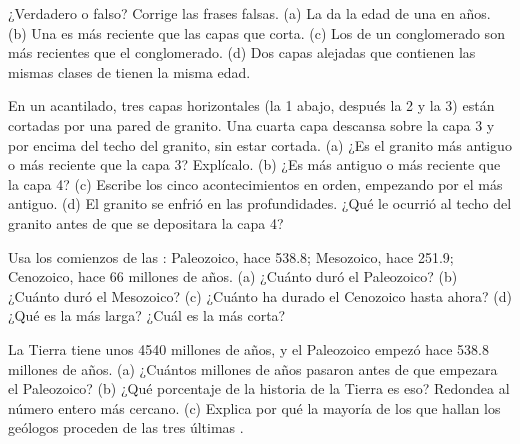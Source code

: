 \begin{exercise}[$\star$]\label{exo:g7:geological-time:4}
¿Verdadero o falso? Corrige las frases falsas. (a) La  da
la edad de una  en años. (b) Una  es más reciente que las capas
que corta. (c) Los  de un conglomerado son más recientes que el
conglomerado. (d) Dos capas alejadas que contienen las mismas clases de
 tienen la misma edad.
\end{exercise}

\begin{exercise}[$\star\star$]\label{exo:g7:geological-time:5}
En un acantilado, tres capas horizontales (la 1 abajo, después la 2 y la 3)
están cortadas por una pared de granito. Una cuarta capa descansa sobre la
capa 3 y por encima del techo del granito, sin estar cortada. (a) ¿Es el
granito más antiguo o más reciente que la capa 3? Explícalo. (b) ¿Es más
antiguo o más reciente que la capa 4? (c) Escribe los cinco
acontecimientos en orden, empezando por el más antiguo. (d) El granito se
enfrió en las profundidades. ¿Qué le ocurrió al techo del granito antes
de que se depositara la capa 4?
\end{exercise}

\begin{exercise}[$\star\star$]\label{exo:g7:geological-time:6}
Usa los comienzos de las : Paleozoico, hace \num{538.8}; Mesozoico,
hace \num{251.9}; Cenozoico, hace \num{66} millones de años. (a) ¿Cuánto
duró el Paleozoico? (b) ¿Cuánto duró el Mesozoico? (c) ¿Cuánto ha durado
el Cenozoico hasta ahora? (d) ¿Qué  es la más larga? ¿Cuál es la más
corta?
\end{exercise}

\begin{exercise}[$\star\star$]\label{exo:g7:geological-time:7}
La Tierra tiene unos \num{4540} millones de años, y el Paleozoico empezó
hace \num{538.8} millones de años. (a) ¿Cuántos millones de años pasaron
antes de que empezara el Paleozoico? (b) ¿Qué porcentaje de la historia de
la Tierra es eso? Redondea al número entero más cercano. (c) Explica por
qué la mayoría de los  que hallan los geólogos proceden de las tres
últimas .
\end{exercise}

